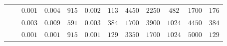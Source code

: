 \begin{table}
\begin{tabulary}{\linewidth}{C|c|C|C|C|C|C|C|C|C|C|C}
		 &  & $0.001$ & $0.004$ & $915$ & $0.002$ & $113$ & $4450$ & $2250$ & $482$ & $1700$ & $176$ \\
		&  & $0.003$ & $0.009$ & $591$ & $0.003$ & $384$ & $1700$ & $3900$ & $1024$ & $4450$ & $384$ \\
		&  & $0.001$ & $0.001$ & $915$ & $0.001$ & $129$ & $3350$ & $1700$ & $1024$ & $5000$ & $129$ \\\hline
	\end{tabulary}
\end{table}
